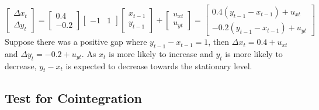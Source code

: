 \documentclass[notitlepage]{article}
\begin{document}
\begin{itemize}
\[    \begin{bmatrix} \Delta x_t \\ \Delta y_t \end{bmatrix} = \begin{bmatrix} 0.4 \\ -0.2\end{bmatrix} \begin{bmatrix} -1 & 1 \end{bmatrix} \begin{bmatrix} x_{t-1} \\ y_{t-1} \end{bmatrix} + \begin{bmatrix} u_{xt} \\ u_{yt} \end{bmatrix} = \begin{bmatrix} 0.4(y_{t-1} - x_{t-1}) + u_{xt} \\ -0.2 (y_{t-1} - x_{t-1}) + u_{yt}\end{bmatrix}
    \]
    Suppose there was a positive gap where \(y_{t-1} - x_{t-1} = 1\), then \(\Delta x_t = 0.4 + u_{xt}\) and \(\Delta y_t = -0.2 + u_{yt}\). As \(x_t\) is more likely to increase and \(y_t\) is more likely to decrease, \(y_{t} - x_{t}\) is expected to decrease towards the stationary level.

\end{itemize}

\subsection{Test for Cointegration}
\end{document}
